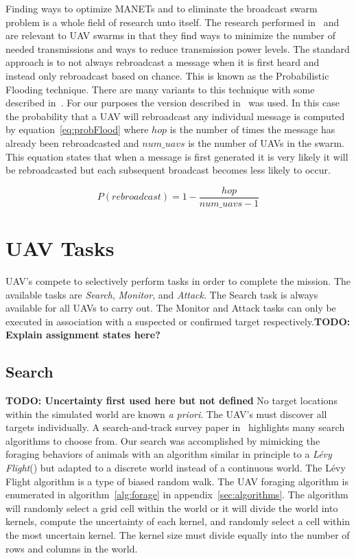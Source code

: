 Finding ways to optimize MANETs and to eliminate the broadcast swarm problem is a whole field of research unto itself.  The research performed in~\cite{epidemicManets} and ~\cite{analysisOptNodeDen} are relevant to UAV swarms in that they find ways to minimize the number of needed transmissions and ways to reduce transmission power levels.  The standard approach is to not always rebroadcast a message when it is first heard and instead only rebroadcast based on chance.  This is known as the Probabilistic Flooding technique.  There are many variants to this technique with some described in~\cite{probFloodVariants}.  For our purposes the version described in~\cite{simpleProbFlood} was used.  In this case the probability that a UAV will rebroadcast any individual message is computed by equation~\ref{eq:probFlood} where $hop$ is the number of times the message has already been rebroadcasted and $num\_uavs$ is the number of UAVs in the swarm.  This equation states that when a message is first generated it is very likely it will be rebroadcasted but each subsequent broadcast becomes less likely to occur.

\begin{equation}
\label{eq:probFlood}
P(rebroadcast) = 1 - \frac{hop}{num\_uavs - 1}
\end{equation}

\section{UAV Tasks}
UAV's compete to selectively perform tasks in order to complete the mission.  The available tasks are \textit{Search}, \textit{Monitor}, and \textit{Attack}.  The Search task is always available for all UAVs to carry out.  The Monitor and Attack tasks can only be executed in association with a suspected or confirmed target respectively.\textbf{TODO: Explain assignment states here?}

\subsection{Search}\textbf{TODO: Uncertainty first used here but not defined}
No target locations within the simulated world are known \textit{a priori}.  The UAV's must discover all targets individually.  A search-and-track survey paper in~\cite{senanayake} highlights many search algorithms to choose from.  Our search was accomplished by mimicking the foraging behaviors of animals with an algorithm similar in principle to a \textit{L\'evy Flight}(\cite{humphries}) but adapted to a discrete world instead of a continuous world.  The L\'evy Flight algorithm is a type of biased random walk.  The UAV foraging algorithm is enumerated in algorithm~\ref{alg:forage} in appendix~\ref{sec:algorithms}.  The algorithm will randomly select a grid cell within the world or it will divide the world into kernels, compute the uncertainty of each kernel, and randomly select a cell within the most uncertain kernel.  The kernel size must divide equally into the number of rows and columns in the world.

